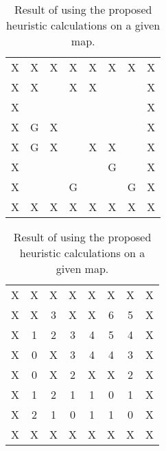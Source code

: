 \begin{table}[H]
\begin{subtable}{.5\linewidth}
\centering
\begin{tabular}{| *{8}{c} |}
\hline
X & X & X & X & X & X & X & X \\
X & X &   & X & X &   &   & X \\
X &   &   &   &   &   &   & X \\
X & G & X &   &   &   &   & X \\
X & G & X &   & X & X &   & X \\
X &   &   &   &   & G &   & X \\
X &   &   & G &   &   & G & X \\
X & X & X & X & X & X & X & X \\
\hline
\end{tabular}
\caption{Original test map.}
\label{fig:orig_testmap}
\end{subtable}
%
\begin{subtable}{.5\linewidth}
\centering
\begin{tabular}{| *{8}{c} |}
\hline
X & X & X & X & X & X & X & X \\
X & X & 3 & X & X & 6 & 5 & X \\
X & 1 & 2 & 3 & 4 & 5 & 4 & X \\
X & 0 & X & 3 & 4 & 4 & 3 & X \\
X & 0 & X & 2 & X & X & 2 & X \\
X & 1 & 2 & 1 & 1 & 0 & 1 & X \\
X & 2 & 1 & 0 & 1 & 1 & 0 & X \\
X & X & X & X & X & X & X & X \\
\hline
\end{tabular}
\caption{Cost test map.}
\label{fig:orig_costmap}
\end{subtable}
\caption{Result of using the proposed heuristic calculations on a given map.}
\end{table}

